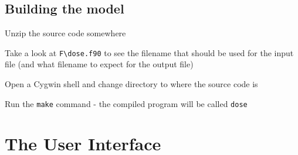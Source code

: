 \documentclass[10pt,a4paper,english]{article}
\begin{document}
\subsection*{Building the model}
\setcounter{listcnt0}{0}
\begin{list}{.}
{
\setlength{\rightmargin}{\leftmargin}
}
\item {} 
Unzip the source code somewhere

\item {} 
Take a look at \texttt{F{\textbackslash}dose.f90} to see the filename that should be used for the input file (and
what filename to expect for the output file)

\item {} 
Open a Cygwin shell and change directory to where the source code is

\item {} 
Run the \texttt{make} command - the compiled program will be called \texttt{dose}

\end{list}



\hypertarget{the-user-interface}{}
\section*{The User Interface}



\hypertarget{id1}{}
\end{document}
